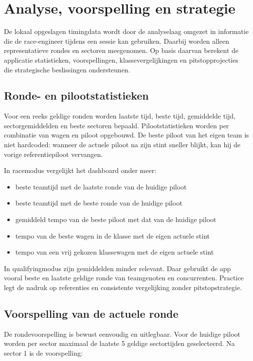 
\chapter{Analyse, voorspelling en strategie}
\label{chap:analyse}

De lokaal opgeslagen timingdata wordt door de analyselaag omgezet in informatie die de race-engineer tijdens een sessie kan gebruiken. Daarbij worden alleen representatieve rondes en sectoren meegenomen. Op basis daarvan berekent de applicatie statistieken, voorspellingen, klassevergelijkingen en pitstopprojecties die strategische beslissingen ondersteunen.

\section{Ronde- en pilootstatistieken}
Voor een reeks geldige ronden worden laatste tijd, beste tijd, gemiddelde tijd, sectorgemiddelden en
beste sectoren bepaald. Pilootstatistieken worden per combinatie van wagen en piloot opgebouwd. De
beste piloot van het eigen team is niet hardcoded: wanneer de actuele piloot na zijn stint
sneller blijkt, kan hij de vorige referentiepiloot vervangen.

In racemodus vergelijkt het dashboard onder meer:

\begin{itemize}
  \item beste teamtijd met de laatste ronde van de huidige piloot
  \item beste teamtijd met de beste ronde van de huidige piloot
  \item gemiddeld tempo van de beste piloot met dat van de huidige piloot
  \item tempo van de beste wagen in de klasse met de eigen actuele stint
  \item tempo van een vrij gekozen klassewagen met de eigen actuele stint
\end{itemize}

In qualifyingmodus zijn gemiddelden minder relevant. Daar gebruikt de app vooral beste en laatste
geldige ronde van teamgenoten en concurrenten. Practice legt de nadruk op referenties en consistente
vergelijking zonder pitstopstrategie.

\section{Voorspelling van de actuele ronde}
De rondevoorspelling is bewust eenvoudig en uitlegbaar. Voor de huidige piloot worden per sector
maximaal de laatste 5 geldige sectortijden geselecteerd. Na sector 1 is de voorspelling:

